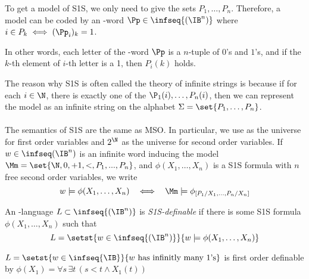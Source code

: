 \begin{remark}
To get a model of S1S, we only need to give the sets $P_1, \dots, P_n$.
Therefore, a model can be coded by an \w-word $\Pp \in \infseq{(\IB^n)}$
where $i \in P_k \iff (\Pp_i)_k = 1$.

In other words, each letter of the \w-word $\Pp$ is a $n$-tuple of
$0$'s and $1$'s, and if the $k$-th element of $i$-th letter is a 1,
then $P_i(k)$ holds.
\end{remark}

The reason why S1S is often called the theory of infinite strings
is because if for each $i \in \N$, there is exactly
one of the $\P_1(i), \dots, P_n(i)$, then
we can represent the model as an infinite string
on the alphabet $\Sigma = \set{P_1, \dots, P_n}$.

\paragraph{}
The semantics of S1S are the same as MSO. In particular,
we use \N as the universe for first order variables
and $2^\N$ as the universe for second order variables.
If $w \in \infiniteWords$ is an infinite word inducing
the model $\Mm = \set{\N, 0, +1, <, P_1, ..., P_n}$,
and $\phi(X_1, \dots, X_n)$
is a S1S formula with $n$ free second order variables,
we write \[
    w \models \phi(X_1, \dots, X_n)
    ~~\iff~~
    \Mm \models \phi_{[P_1/X_1, \dots, P_n/X_n]}
\]

\begin{definition}
    An \w-language $L \subset \infseq{(\IB^n)}$ is
    \emph{S1S-definable} if there is some S1S formula
    $\phi(X_1, \dots, X_n)$ such that
\[
    L = \setst{w \in \infseq{(\IB^n)}}{
        w \models \phi(X_1, \dots, X_n)
    }
\]
\end{definition}

\begin{example}
    $L = \setst{w \in \infseq{\IB}}{w \text{ has infinitly many 1's}}$
    is first order definable by
    $\phi(X_1) = \forall s\, \exists t\, (s < t \wedge X_1(t))$
\end{example}




